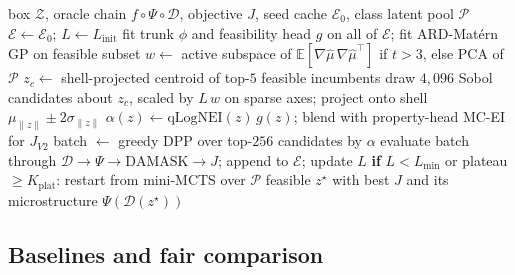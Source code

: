 \documentclass[preprint,12pt]{elsarticle}
\begin{document}
\begin{algorithm}[t]
\caption{MERIDIAN: one outer round of the active-learning design loop ($T = 40$ rounds, batch $q = 4$).}
\label{alg:meridian}
\begin{algorithmic}[1]
\Require box $\mathcal{Z}$, oracle chain $f \circ \Psi \circ \mathcal{D}$, objective $J$, seed cache $\mathcal{E}_0$, class latent pool $\mathcal{P}$
\State $\mathcal{E} \gets \mathcal{E}_0$; \quad $L \gets L_{\mathrm{init}}$
  \State fit trunk $\phi$ and feasibility head $g$ on all of $\mathcal{E}$; fit ARD-Mat\'ern GP on feasible subset 
  \State $w \gets$ active subspace of $\mathbb{E}[\nabla\hat\mu\, \nabla\hat\mu^{\top}]$ if $t > 3$, else PCA of $\mathcal{P}$ 
  \State $z_c \gets$ shell-projected centroid of top-$5$ feasible incumbents
  \State draw $4{,}096$ Sobol candidates about $z_c$, scaled by $L\, w$ on sparse axes; project onto shell $\mu_{\|z\|} \pm 2\sigma_{\|z\|}$
  \State $\alpha(z) \gets \mathrm{qLogNEI}(z)\, g(z)$; blend with property-head MC-EI for $J_{V2}$ 
  \State batch $\gets$ greedy DPP over top-$256$ candidates by $\alpha$ 
  \State evaluate batch through $\mathcal{D} \to \Psi \to \mathrm{DAMASK} \to J$; append to $\mathcal{E}$; update $L$
  \State \textbf{if} $L < L_{\min}$ or plateau $\geq K_{\mathrm{plat}}$: restart from mini-MCTS over $\mathcal{P}$
\EndFor
\State \Return feasible $z^{\star}$ with best $J$ and its microstructure $\Psi(\mathcal{D}(z^{\star}))$
\end{algorithmic}
\end{algorithm}

\subsection{Baselines and fair comparison}
\label{sec:baselines}
\end{document}
